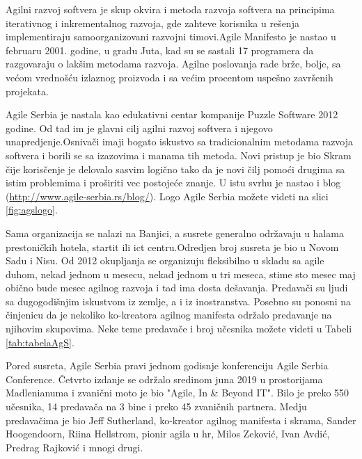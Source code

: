 \documentclass[a4paper]{article}
\begin{document}
{Agilni razvoj softvera je skup okvira i metoda razvoja softvera na principima iterativnog i inkrementalnog razvoja, gde zahteve korisnika u rešenja implementiraju samoorganizovani razvojni timovi.Agile Manifesto je nastao u februaru 2001. godine, u gradu Juta, kad su se sastali 17 programera da razgovaraju o lakšim metodama razvoja. Agilne poslovanja rade brže, bolje, sa većom vrednošću izlaznog proizvoda i sa većim procentom uspešno završenih projekata.

Agile Serbia je nastala kao edukativni centar kompanije Puzzle Software 2012 godine. Od tad im je glavni cilj agilni razvoj softvera i njegovo unapredjenje.Osnivači imaji bogato iskustvo sa tradicionalnim metodama razvoja softvera i borili se sa izazovima i manama tih metoda. Novi pristup je bio Skram čije korisčenje je delovalo sasvim logično tako da je novi čilj pomoći drugima sa istim problemima i proširiti vec postojeće znanje. U istu svrhu je nastao i blog (\url{http://www.agile-serbia.rs/blog/}). Logo Agile Serbia možete videti na slici \ref{fig:agslogo}.

Sama organizacija se nalazi na Banjici, a susrete generalno održavaju u halama prestoničkih hotela, startit ili ict centru.Odredjen broj susreta je bio u Novom Sadu i Nisu. Od 2012 okupljanja se organizuju fleksibilno u skladu sa agile duhom, nekad jednom u mesecu, nekad jednom u tri meseca, stime sto mesec maj obično bude mesec agilnog razvoja i tad ima dosta dešavanja. Predavači su ljudi sa dugogodišnjim iskustvom iz zemlje, a i iz inostranstva. Posebno su ponosni na činjenicu da je nekoliko ko-kreatora agilnog manifesta održalo predavanje na njihovim skupovima. Neke teme predavače i broj učesnika možete videti u Tabeli \ref{tab:tabelaAgS}.

Pored susreta, Agile Serbia pravi jednom godisnje konferenciju Agile Serbia Conference. Četvrto izdanje se održalo sredinom juna 2019 u prostorijama Madlenianuma i zvanični moto je bio "Agile, In \& Beyond IT". Bilo je preko 550 učesnika, 14 predavača na 3 bine i preko 45 zvaničnih partnera. Medju predavačima je bio Jeff Sutherland, ko-kreator agilnog manifesta i skrama, Sander Hoogendoorn, Riina Hellstrom, pionir agila u hr, Milos Zeković, Ivan Avdić, Predrag Rajković i mnogi drugi.\\

}
\end{document}
